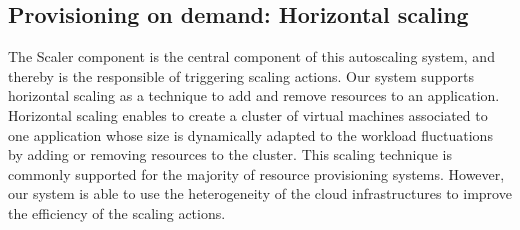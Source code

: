 \subsection{Provisioning on demand: Horizontal scaling}
The Scaler component is the central component of this autoscaling system, and thereby is the responsible of triggering scaling actions. Our system supports horizontal scaling as a technique to add and remove resources to an application. Horizontal scaling enables to create a cluster of virtual machines associated to one application whose size is dynamically adapted to the workload fluctuations by adding or removing resources to the cluster. This scaling technique is commonly supported for the majority of resource provisioning systems. However, our system is able to use the heterogeneity of the cloud infrastructures to improve the efficiency of the scaling actions.


